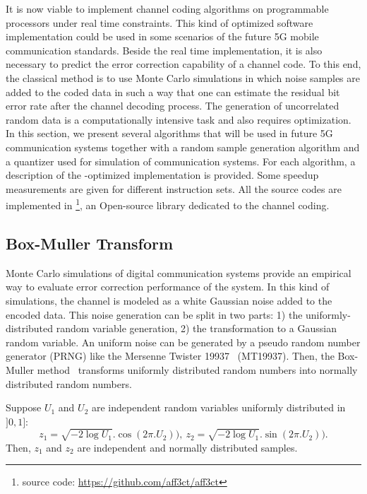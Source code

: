It is now viable to implement channel coding algorithms on programmable
processors under real time constraints. This kind of optimized software
implementation could be used in some scenarios of the future 5G mobile
communication standards. Beside the real time implementation, it is also
necessary to predict the error correction capability of a channel code. To this
end, the classical method is to use Monte Carlo simulations in which noise
samples are added to the coded data in such a way that one can estimate the
residual bit error rate after the channel decoding process. The generation of
uncorrelated random data is a computationally intensive task and also requires
optimization. In this section, we present several algorithms that will be used
in future 5G communication systems together with a random sample generation
algorithm and a quantizer used for simulation of communication systems. For each
algorithm, a description of the \MIPP-optimized implementation is provided. Some
speedup measurements are given for different instruction sets. All the source
codes are implemented in \AFFECT\footnote{\AFFECT source code:
\url{https://github.com/aff3ct/aff3ct}}, an Open-source library dedicated to the
channel coding.

\subsection{Box-Muller Transform}
\label{sec:vec_awgn}

Monte Carlo simulations of digital communication systems provide an empirical
way to evaluate error correction performance of the system. In this kind of
simulations, the channel is modeled as a white Gaussian noise added to the
encoded data. This noise generation can be split in two parts: 1) the
uniformly-distributed random variable generation, 2) the transformation to a
Gaussian random variable. An uniform noise can be generated by a pseudo random
number generator (PRNG) like the Mersenne Twister 19937~\cite{Matsumoto1998}
(MT19937). Then, the Box-Muller method~\cite{Box1958} transforms uniformly
distributed random numbers into normally distributed random numbers.

Suppose $U_1$ and $U_2$ are independent random variables uniformly distributed
in $]0, 1]$:
\begin{equation*}
  z_1 = \sqrt{-2 \log{U_1}}.\cos(2\pi.U_2)),~z_2 = \sqrt{-2 \log{U_1}}.\sin(2\pi.U_2)).
\end{equation*}
Then, $z_1$ and $z_2$ are independent and normally distributed samples.


